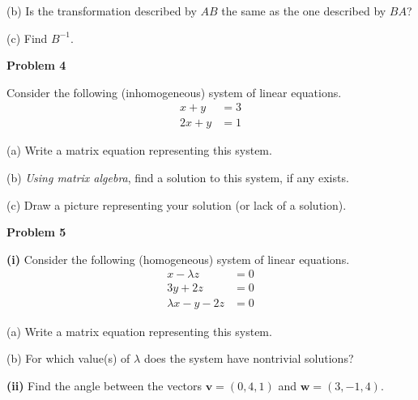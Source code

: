 \documentclass[12pt]{amsbook}
\begin{document}
\vspace{3cm}

(b) Is the transformation described by $AB$ the same as the one described by $BA$?

\vspace{4cm}

(c) Find $B^{-1}$.




\newpage

\textbf{Problem 4}

\vspace{.25cm}

Consider the following (inhomogeneous) system of linear equations.
\begin{align*}
x + y &= 3 \\
2x + y &= 1
\end{align*}

(a) Write a matrix equation representing this system.

\vspace{3cm}

(b) \emph{Using matrix algebra}, find a solution to this system, if any exists.

\vspace{9cm}

(c) Draw a picture representing your solution (or lack of a solution).










\newpage

\textbf{Problem 5}

\vspace{.25cm}

\textbf{(i)} Consider the following (homogeneous) system of linear equations.
\begin{align*}
x - \lambda z &= 0 \\
3y + 2z &= 0 \\
\lambda x - y - 2z &= 0
\end{align*}

(a) Write a matrix equation representing this system.

\vspace{2cm}

(b) For which value(s) of $\lambda$ does the system have nontrivial solutions?
\vspace{5cm}




\textbf{(ii)} Find the angle between the vectors $\textbf{v} = (0,4,1)$ and $\textbf{w} = (3,-1,4)$.
\end{document}
